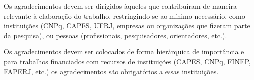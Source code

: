 \begin{agradecimentos}
Os agradecimentos devem ser dirigidos àqueles que contribuíram de maneira relevante à elaboração do trabalho,
restringindo-se ao mínimo necessário, como instituições (CNPq, CAPES, UFRJ, empresas ou organizações que fizeram parte
da pesquisa), ou pessoas (profissionais, pesquisadores, orientadores, etc.).

Os agradecimentos devem ser colocados de forma hierárquica de importância e para trabalhos financiados com recursos de
instituições (CAPES, CNPq, FINEP, FAPERJ, etc.) os agradecimentos são obrigatórios a essas instituições.
\end{agradecimentos}